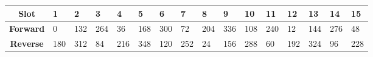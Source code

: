 \documentclass{reportClass}
\begin{document}
\begin{table}[h!]
\centering
\begin{tabular}{|clllllllllllllll|}
\hline
\multicolumn{1}{|c|}{\textbf{Slot}}    & \multicolumn{1}{l|}{\textbf{1}}                          & \multicolumn{1}{l|}{\textbf{2}}                          & \multicolumn{1}{l|}{\textbf{3}}                          & \multicolumn{1}{l|}{\textbf{4}}                          & \multicolumn{1}{l|}{\textbf{5}}                          & \multicolumn{1}{l|}{\textbf{6}}                          & \multicolumn{1}{l|}{\textbf{7}}                          & \multicolumn{1}{l|}{\textbf{8}}                          & \multicolumn{1}{l|}{\textbf{9}}                          & \multicolumn{1}{l|}{\textbf{10}}                         & \multicolumn{1}{l|}{\textbf{11}}                         & \multicolumn{1}{l|}{\textbf{12}}                         & \multicolumn{1}{l|}{\textbf{13}}                         & \multicolumn{1}{l|}{\textbf{14}}                         & \textbf{15}                         \\ \hline
\multicolumn{1}{|c|}{\textbf{Forward}} & \multicolumn{1}{l|}{0}                                   & \multicolumn{1}{l|}{132}                                 & \multicolumn{1}{l|}{264}                                 & \multicolumn{1}{l|}{36}                                  & \multicolumn{1}{l|}{168}                                 & \multicolumn{1}{l|}{300}                                 & \multicolumn{1}{l|}{72}                                  & \multicolumn{1}{l|}{204}                                 & \multicolumn{1}{l|}{336}                                 & \multicolumn{1}{l|}{108}                                 & \multicolumn{1}{l|}{240}                                 & \multicolumn{1}{l|}{12}                                  & \multicolumn{1}{l|}{144}                                 & \multicolumn{1}{l|}{276}                                 & 48                                  \\ \hline
\multicolumn{1}{|c|}{\textbf{Reverse}} & \multicolumn{1}{l|}{180}                                 & \multicolumn{1}{l|}{312}                                 & \multicolumn{1}{l|}{84}                                  & \multicolumn{1}{l|}{216}                                 & \multicolumn{1}{l|}{348}                                 & \multicolumn{1}{l|}{120}                                 & \multicolumn{1}{l|}{252}                                 & \multicolumn{1}{l|}{24}                                  & \multicolumn{1}{l|}{156}                                 & \multicolumn{1}{l|}{288}                                 & \multicolumn{1}{l|}{60}                                  & \multicolumn{1}{l|}{192}                                 & \multicolumn{1}{l|}{324}                                 & \multicolumn{1}{l|}{96}                                  & 228                                 \\ \hline

\end{tabular}
\end{table}
\end{document}
